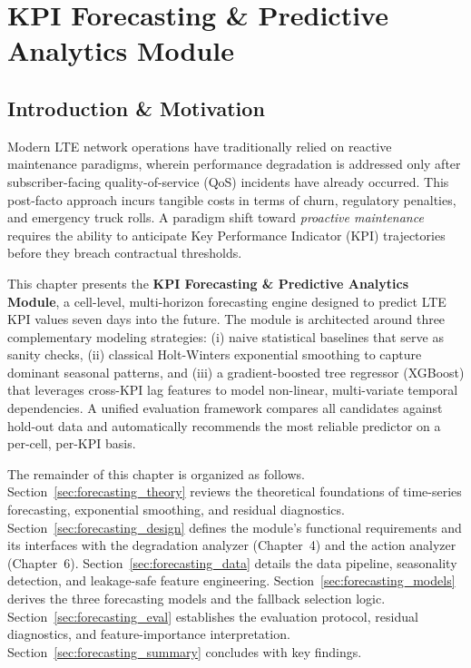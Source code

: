 \chapter{KPI Forecasting \& Predictive Analytics Module}
\label{ch:forecasting}

\section{Introduction \& Motivation}
\label{sec:forecasting_intro}

Modern LTE network operations have traditionally relied on reactive maintenance paradigms, wherein performance degradation is addressed only after subscriber-facing quality-of-service (QoS) incidents have already occurred. This post-facto approach incurs tangible costs in terms of churn, regulatory penalties, and emergency truck rolls. A paradigm shift toward \emph{proactive maintenance} requires the ability to anticipate Key Performance Indicator (KPI) trajectories before they breach contractual thresholds.

This chapter presents the \textbf{KPI Forecasting \& Predictive Analytics Module}, a cell-level, multi-horizon forecasting engine designed to predict LTE KPI values seven days into the future. The module is architected around three complementary modeling strategies: (i) naive statistical baselines that serve as sanity checks, (ii) classical Holt-Winters exponential smoothing to capture dominant seasonal patterns, and (iii) a gradient-boosted tree regressor (XGBoost) that leverages cross-KPI lag features to model non-linear, multi-variate temporal dependencies. A unified evaluation framework compares all candidates against hold-out data and automatically recommends the most reliable predictor on a per-cell, per-KPI basis.

The remainder of this chapter is organized as follows. Section~\ref{sec:forecasting_theory} reviews the theoretical foundations of time-series forecasting, exponential smoothing, and residual diagnostics. Section~\ref{sec:forecasting_design} defines the module's functional requirements and its interfaces with the degradation analyzer (Chapter~4) and the action analyzer (Chapter~6). Section~\ref{sec:forecasting_data} details the data pipeline, seasonality detection, and leakage-safe feature engineering. Section~\ref{sec:forecasting_models} derives the three forecasting models and the fallback selection logic. Section~\ref{sec:forecasting_eval} establishes the evaluation protocol, residual diagnostics, and feature-importance interpretation. Section~\ref{sec:forecasting_summary} concludes with key findings.



